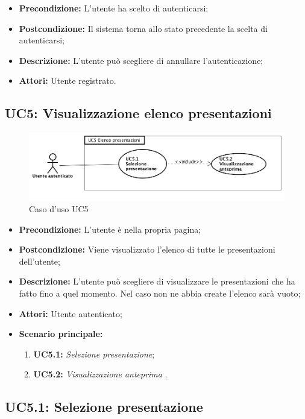 \begin{itemize}
	\item \textbf{Precondizione:} L'utente ha scelto di autenticarsi;
	\item \textbf{Postcondizione:} Il sistema torna allo stato precedente la scelta di autenticarsi;
	\item \textbf{Descrizione:} L'utente può scegliere di annullare l'autenticazione;
	\item \textbf{Attori:} Utente registrato.
\end{itemize}
\subsection{ UC5: Visualizzazione elenco presentazioni}

\begin{figure}[h]
	\begin{center}
	\includegraphics[scale=0.4]{diagram/UC5.png}
	\caption{Caso d'uso UC5}
	\end{center}
\end{figure}
\begin{itemize}
	\item \textbf{Precondizione:} L'utente è nella propria pagina;
	\item \textbf{Postcondizione:} Viene visualizzato l'elenco di tutte le presentazioni dell'utente;
	\item \textbf{Descrizione:} L'utente può scegliere di visualizzare le presentazioni che ha fatto fino a quel momento. Nel caso non ne abbia create l'elenco sarà vuoto;
	\item \textbf{Attori:} Utente autenticato;
	\item \textbf{Scenario principale:}
	\begin{enumerate}
		\item \textbf{ UC5.1:} \textit{ Selezione presentazione};
		\item \textbf{ UC5.2:} \textit{ Visualizzazione anteprima }.
	\end{enumerate}
\end{itemize}

\newpage
\subsection{ UC5.1: Selezione presentazione}

